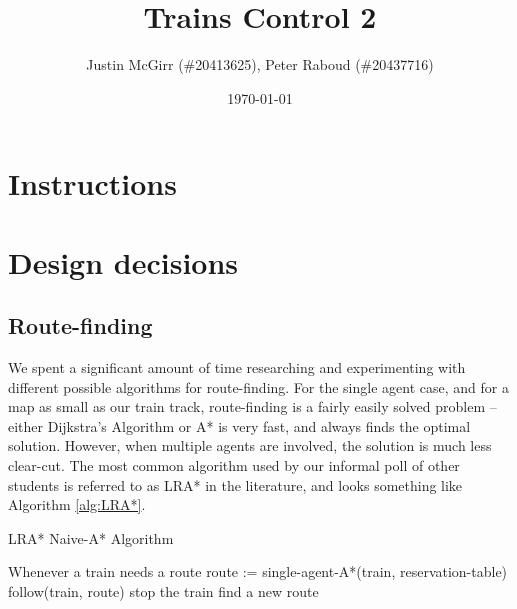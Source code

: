 \documentclass{article}
\title{Trains Control 2}
\author{Justin McGirr (\#20413625), Peter Raboud (\#20437716)}
\date{\today}
\begin{document}
\maketitle

\section{Instructions}


\section{Design decisions}

\subsection{Route-finding}
We spent a significant amount of time researching and experimenting with
different possible algorithms for route-finding. For the single agent case,
and for a map as small as our train track, route-finding is a fairly easily
solved problem -- either Dijkstra's Algorithm or A* is very fast,
and always finds the optimal solution.
However, when multiple agents are involved, the solution
is much less clear-cut. The most common algorithm used by our informal poll
of other students is referred to as LRA* in the literature, and looks
something like Algorithm \ref{alg:LRA*}.
\begin{algorithm}
\label{alg:LRA*}
\caption{LRA* Naive-A* Algorithm}
\begin{algorithmic}
\Loop
\State Whenever a train needs a route
\State route := single-agent-A*(train, reservation-table)
\State follow(train, route)
\EndLoop
{}
		\State stop the train
		\State find a new route
	\EndIf
	\State [...]
\EndFunction
\end{algorithmic}
\end{algorithm}
\end{document}
